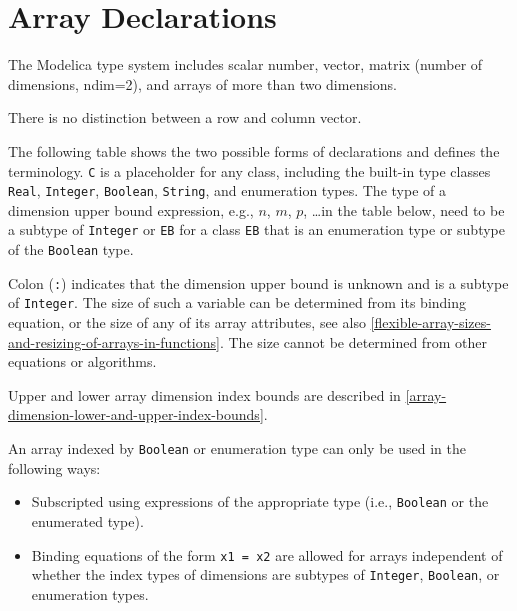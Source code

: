 \section{Array Declarations}\label{array-declarations}

The Modelica type system includes scalar number, vector, matrix (number of dimensions, ndim=2), and arrays of more than two dimensions.

\begin{nonnormative}
There is no distinction between a row and column vector.
\end{nonnormative}

The following table shows the two possible forms of declarations and defines the terminology.
\lstinline!C! is a placeholder for any class, including the built-in type classes \lstinline!Real!, \lstinline!Integer!, \lstinline!Boolean!, \lstinline!String!, and enumeration types.
The type of a dimension upper bound expression, e.g., $n$, $m$, $p$, \ldots in the table below, need to be a subtype of \lstinline!Integer! or \lstinline!EB! for a class \lstinline!EB! that is an enumeration type or subtype of the \lstinline!Boolean! type.

Colon (\lstinline!:!) indicates that the dimension upper bound is unknown and is a subtype of \lstinline!Integer!.
The size of such a variable can be determined from its binding equation, or the size of any of its array attributes, see also \cref{flexible-array-sizes-and-resizing-of-arrays-in-functions}.
The size cannot be determined from other equations or algorithms.

Upper and lower array dimension index bounds are described in \cref{array-dimension-lower-and-upper-index-bounds}.

An array indexed by \lstinline!Boolean! or enumeration type can only be used in the following ways:
\begin{itemize}
\item
  Subscripted using expressions of the appropriate type (i.e., \lstinline!Boolean! or the enumerated type).
\item
  Binding equations of the form \lstinline!x1 = x2! are allowed for arrays independent of whether the index types of dimensions are subtypes of \lstinline!Integer!, \lstinline!Boolean!, or enumeration types.
\end{itemize}

